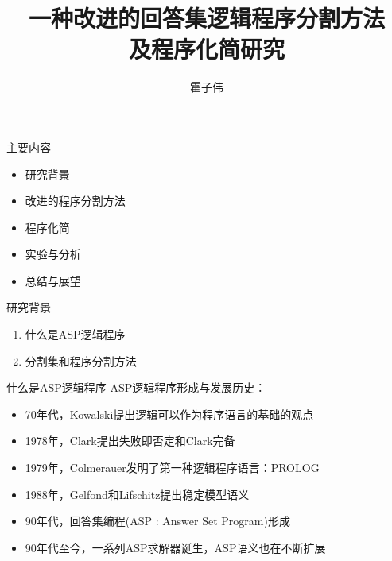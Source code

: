 \documentclass{beamer}
\title{一种改进的回答集逻辑程序分割方法 \\ 及程序化简研究}
\author{霍子伟}
\institute{中山大学软件学院}
\begin{document}
\titlepage


\begin{frame}[t]{主要内容}
	\begin{itemize}
		\item {研究背景}
		\item {改进的程序分割方法
			}
		\item {程序化简}
		\item {实验与分析
			}
		\item {总结与展望
			}
	\end{itemize}
\end{frame}


\begin{frame}[t]{研究背景}
	\begin{enumerate}
		\item 什么是ASP逻辑程序
		\item 分割集和程序分割方法
	\end{enumerate}
\end{frame}


\begin{frame}[t]{什么是ASP逻辑程序}
	ASP逻辑程序形成与发展历史：
	\begin{itemize}
		\item 70年代，Kowalski提出逻辑可以作为程序语言的基础的观点
		\item 1978年，Clark提出失败即否定和Clark完备
		\item 1979年，Colmerauer发明了第一种逻辑程序语言：PROLOG
		\item 1988年，Gelfond和Lifschitz提出稳定模型语义
		\item 90年代，回答集编程(ASP : Answer Set Program)形成
		\item 90年代至今，一系列ASP求解器诞生，ASP语义也在不断扩展
	\end{itemize}
\end{frame}
\end{document}
